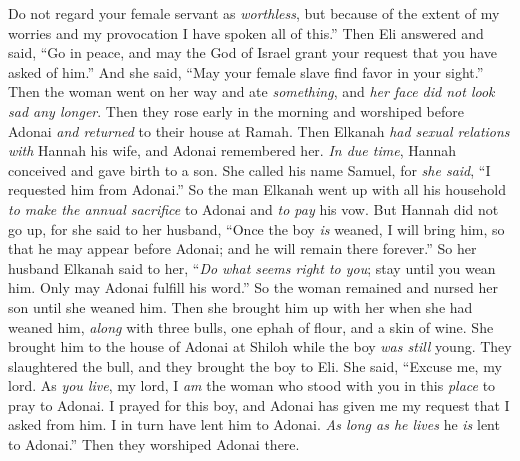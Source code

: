 \begin{biblechapter}
\verse Do not regard your female servant as \textit{worthless}, but because of the extent of my worries and my provocation I have spoken all of this.”
\verse Then Eli answered and said, “Go in peace, and may the God of Israel grant your request that you have asked of him.”
\verse And she said, “May your female slave find favor in your sight.” Then the woman went on her way and ate \textit{something}, and \textit{her face did not look sad any longer}.
 Then they rose early in the morning and worshiped before Adonai \textit{and returned} to their house at Ramah. Then Elkanah \textit{had sexual relations with} Hannah his wife, and Adonai remembered her.
\verse \textit{In due time}, Hannah conceived and gave birth to a son. She called his name Samuel, for \textit{she said}, “I requested him from Adonai.”
\verse So the man Elkanah went up with all his household \textit{to make the annual sacrifice} to Adonai and \textit{to pay} his vow.
\verse But Hannah did not go up, for she said to her husband, “Once the boy \textit{is} weaned, I will bring him, so that he may appear before Adonai; and he will remain there forever.”
\verse So her husband Elkanah said to her, “\textit{Do what seems right to you}; stay until you wean him. Only may Adonai fulfill his word.” So the woman remained and nursed her son until she weaned him.
\verse Then she brought him up with her when she had weaned him, \textit{along} with three bulls, one ephah of flour, and a skin of wine. She brought him to the house of Adonai at Shiloh while the boy \textit{was still} young.
\verse They slaughtered the bull, and they brought the boy to Eli.
\verse She said, “Excuse me, my lord. As \textit{you live}, my lord, I \textit{am} the woman who stood with you in this \textit{place} to pray to Adonai.
\verse I prayed for this boy, and Adonai has given me my request that I asked from him.
\verse I in turn have lent him to Adonai. \textit{As long as he lives} he \textit{is} lent to Adonai.” Then they worshiped Adonai there.
\end{biblechapter}

